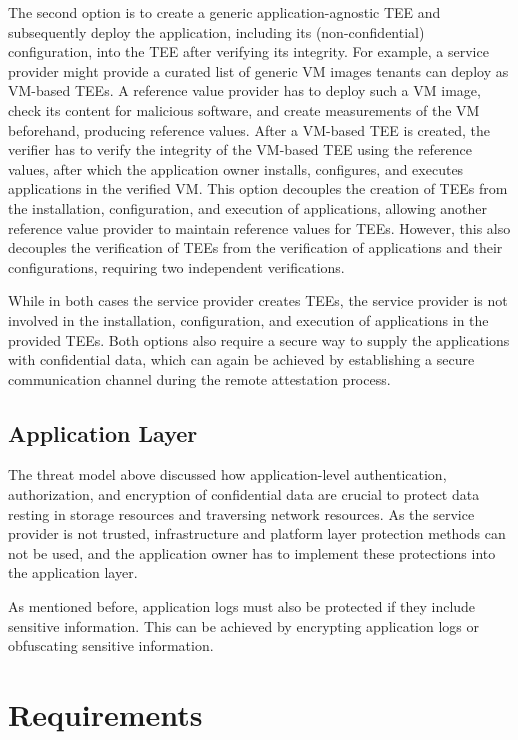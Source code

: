\begin{description}[style=standard]
    The second option is to create a generic application-agnostic TEE and
    subsequently deploy the application, including its (non-confidential)
    configuration, into the TEE after verifying its integrity. For example, a
    service provider might provide a curated list of generic VM images tenants
    can deploy as VM-based TEEs. A reference value provider has to deploy such a
    VM image, check its content for malicious software, and create measurements
    of the VM beforehand, producing reference values. After a VM-based TEE is
    created, the verifier has to verify the integrity of the VM-based TEE using
    the reference values, after which the application owner installs,
    configures, and executes applications in the verified VM. This option
    decouples the creation of TEEs from the installation, configuration, and
    execution of applications, allowing another reference value provider to
    maintain reference values for TEEs. However, this also decouples the
    verification of TEEs from the verification of applications and their
    configurations, requiring two independent verifications.

    While in both cases the service provider creates TEEs, the service provider
    is not involved in the installation, configuration, and execution of
    applications in the provided TEEs. Both options also require a secure way to
    supply the applications with confidential data, which can again be achieved
    by establishing a secure communication channel during the remote attestation
    process.
\end{description}

\subsection{Application Layer}

The threat model above discussed how application-level authentication,
authorization, and encryption of confidential data are crucial to protect data
resting in storage resources and traversing network resources. As the service
provider is not trusted, infrastructure and platform layer protection methods
can not be used, and the application owner has to implement these protections
into the application layer.

As mentioned before, application logs must also be protected if they include
sensitive information. This can be achieved by encrypting application logs or
obfuscating sensitive information.

\section{Requirements}
\label{sec:requirements}

